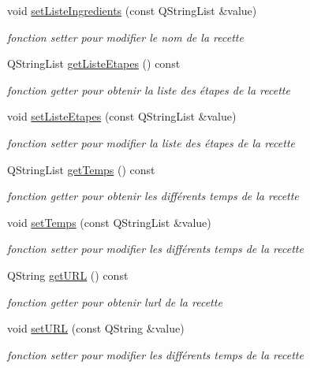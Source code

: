 \begin{DoxyCompactItemize}
void \hyperlink{classRecette_a5d50321b71741def086d7897e2dd62f7}{set\+Liste\+Ingredients} (const Q\+String\+List \&value)
\begin{DoxyCompactList}\small\item\em fonction setter pour modifier le nom de la recette \end{DoxyCompactList}\item 
Q\+String\+List \hyperlink{classRecette_a3b2807fe1f55431bcd632bff2332c6e7}{get\+Liste\+Etapes} () const
\begin{DoxyCompactList}\small\item\em fonction getter pour obtenir la liste des étapes de la recette \end{DoxyCompactList}\item 
void \hyperlink{classRecette_aaf908c155a9b4936b94ca7852232f57d}{set\+Liste\+Etapes} (const Q\+String\+List \&value)
\begin{DoxyCompactList}\small\item\em fonction setter pour modifier la liste des étapes de la recette \end{DoxyCompactList}\item 
Q\+String\+List \hyperlink{classRecette_a9ac38f333d17699fb6601bca332d8567}{get\+Temps} () const
\begin{DoxyCompactList}\small\item\em fonction getter pour obtenir les différents temps de la recette \end{DoxyCompactList}\item 
void \hyperlink{classRecette_ad23ff518166fa2616c64c94e427cd32b}{set\+Temps} (const Q\+String\+List \&value)
\begin{DoxyCompactList}\small\item\em fonction setter pour modifier les différents temps de la recette \end{DoxyCompactList}\item 
Q\+String \hyperlink{classRecette_ab06006324a8201e9967b53273dbf2751}{get\+U\+RL} () const
\begin{DoxyCompactList}\small\item\em fonction getter pour obtenir l\textquotesingle{}url de la recette \end{DoxyCompactList}\item 
void \hyperlink{classRecette_ac910b38482d259cba788f41669e765b1}{set\+U\+RL} (const Q\+String \&value)
\begin{DoxyCompactList}\small\item\em fonction setter pour modifier les différents temps de la recette \end{DoxyCompactList}\item 

\end{DoxyCompactItemize}
